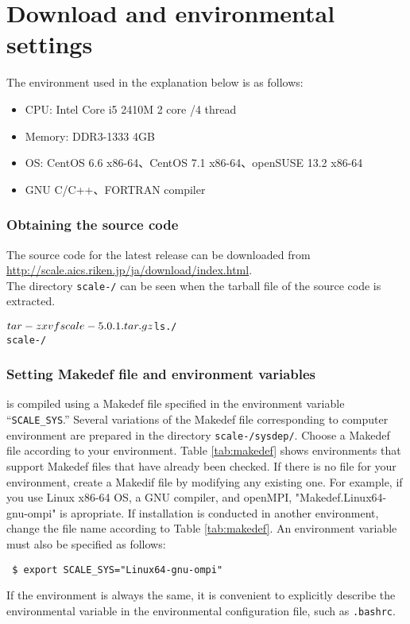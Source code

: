 \section{Download and environmental settings} \label{sec:scale_compile}

The environment used in the explanation below is as follows:
\begin{itemize}
\item CPU: Intel Core i5 2410M 2 core /4 thread
\item Memory: DDR3-1333 4GB
\item OS: CentOS 6.6 x86-64、CentOS 7.1 x86-64、openSUSE 13.2 x86-64
\item GNU C/C++、FORTRAN compiler %
\end{itemize}

\subsubsection{Obtaining the source code} %
The source code for the latest release can be downloaded
from \url{http://scale.aics.riken.jp/ja/download/index.html}.\\
The directory \texttt{scale-{\version}/} can be seen when the tarball file of the source code is extracted.
\begin{alltt}
 $ tar -zxvf scale-{\version}.tar.gz
 $ ls ./
    scale-{\version}/
\end{alltt}

\subsubsection{Setting Makedef file and environment variables} \label{subsec:environment}

\scalelib is compiled using a Makedef file specified in the environment variable ``\verb|SCALE_SYS|.''  Several variations of the Makedef file corresponding to computer environment are prepared in the directory \texttt{scale-{\version}/sysdep/}.  Choose a Makedef file according to your environment. Table \ref{tab:makedef} shows  environments that support Makedef files that have already been checked. If there is no file for your environment,  create a Makedif file by modifying any existing one.
For example, if you use Linux x86-64 OS, a GNU compiler, and openMPI, "Makedef.Linux64-gnu-ompi" is apropriate.
If installation is conducted in another environment, change the file name according to Table \ref{tab:makedef}. An environment variable must also be specified as follows:
\begin{verbatim}
 $ export SCALE_SYS="Linux64-gnu-ompi"
\end{verbatim}
If the environment is always the same, it is convenient to explicitly describe the environmental variable in the environmental configuration file, such as \verb|.bashrc|.

